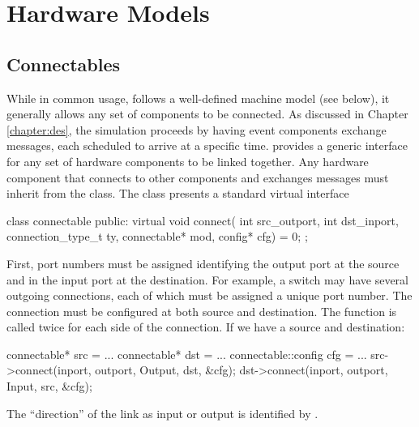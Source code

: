 
\newcommand{\nodecls}{\inlinecode{node}\xspace}
\newcommand{\topcls}{\inlinecode{topology}\xspace}
\newcommand{\switchid}{\inlinecode{switch_id}\xspace}
\newcommand{\nodeid}{\inlinecode{node_id}\xspace}

\chapter{Hardware Models}
\label{chapter:hardware}

\section{Connectables}
\label{sec:connectables}
While in common usage, \sstmacro follows a well-defined machine model (see below),
it generally allows any set of components to be connected. 
As discussed in Chapter \ref{chapter:des}, the simulation proceeds by having event components exchange messages,
each scheduled to arrive at a specific time.
\sstmacro provides a generic interface for any set of hardware components to be linked together.
Any hardware component that connects to other components and exchanges messages must inherit from the  class.
The  class presents a standard virtual interface

\begin{CppCode}
class connectable
{
 public:
  virtual void
  connect(
    int src_outport,
    int dst_inport,
    connection_type_t ty,
    connectable* mod,
    config* cfg) = 0;
};
\end{CppCode}

First, port numbers must be assigned identifying the output port at the source and in the input port at the destination.
For example, a switch may have several outgoing connections, each of which must be assigned a unique port number.
The connection must be configured at both source and destination.
The function is called twice for each side of the connection. If we have a source and destination:

\begin{CppCode}
connectable* src = ...
connectable* dst = ...
connectable::config cfg = ...
src->connect(inport, outport, Output, dst, &cfg);
dst->connect(inport, outport, Input, src, &cfg);
\end{CppCode}

The ``direction'' of the link as input or output is identified by .


